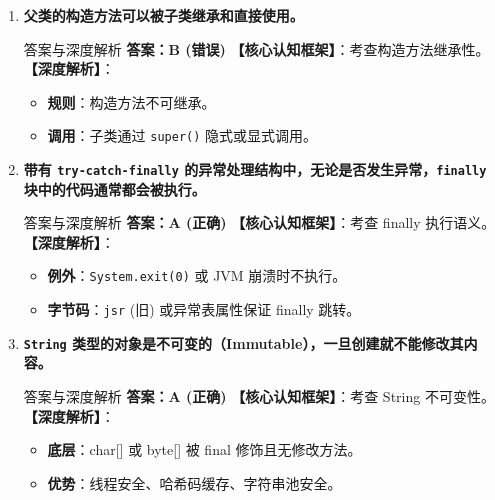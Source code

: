 ﻿\documentclass[12pt, a4paper]{ctexart}
\newcommand{\code}[1]{\texttt{#1}}
\begin{document}
\begin{enumerate}[label=\textbf{\arabic*.}, leftmargin=*, itemsep=1.5em]
	\item \textbf{父类的构造方法可以被子类继承和直接使用。}
	      \begin{bluebox}{答案与深度解析}
		      \textbf{答案：B (错误)}
		      \textbf{【核心认知框架】}：考查构造方法继承性。
		      \textbf{【深度解析】}：
		      \begin{itemize}[leftmargin=*, nosep]
			      \item \textbf{规则}：构造方法不可继承。
			      \item \textbf{调用}：子类通过 \code{super()} 隐式或显式调用。
		      \end{itemize}
	      \end{bluebox}

	\item \textbf{带有 \code{try-catch-finally} 的异常处理结构中，无论是否发生异常，\code{finally} 块中的代码通常都会被执行。}
	      \begin{bluebox}{答案与深度解析}
		      \textbf{答案：A (正确)}
		      \textbf{【核心认知框架】}：考查 finally 执行语义。
		      \textbf{【深度解析】}：
		      \begin{itemize}[leftmargin=*, nosep]
			      \item \textbf{例外}：\code{System.exit(0)} 或 JVM 崩溃时不执行。
			      \item \textbf{字节码}：\code{jsr} (旧) 或异常表属性保证 finally 跳转。
		      \end{itemize}
	      \end{bluebox}

	\item \textbf{\code{String} 类型的对象是不可变的（Immutable），一旦创建就不能修改其内容。}
	      \begin{bluebox}{答案与深度解析}
		      \textbf{答案：A (正确)}
		      \textbf{【核心认知框架】}：考查 String 不可变性。
		      \textbf{【深度解析】}：
		      \begin{itemize}[leftmargin=*, nosep]
			      \item \textbf{底层}：char[] 或 byte[] 被 final 修饰且无修改方法。
			      \item \textbf{优势}：线程安全、哈希码缓存、字符串池安全。
		      \end{itemize}
	      \end{bluebox}


\end{enumerate}
\end{document}
